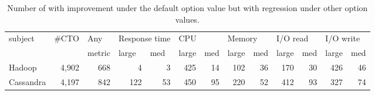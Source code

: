 \begin{table}[t]
\centering
\caption{Number of \instance with improvement under the default option value but with regression under other option values.}
    \begin{tabular}{|l|l|l|l|r|l|r|l|r|l|r|l|r|}
    \hline
    \multirow{2}{*}{subject} & \multirow{2}{*}{\#CTO}     & Any                      & \multicolumn{2}{l|}{Response time}                  & \multicolumn{2}{l|}{CPU}                            & \multicolumn{2}{l|}{Memory}                         & \multicolumn{2}{l|}{I/O read}                       & \multicolumn{2}{l|}{I/O write}                      \\ \cline{4-13} 
                             &                            & metric                   & large                    & \multicolumn{1}{l|}{med} & large                    & \multicolumn{1}{l|}{med} & large                    & \multicolumn{1}{l|}{med} & large                    & \multicolumn{1}{l|}{med} & large                    & \multicolumn{1}{l|}{med} \\ \hline
    Hadoop                   & \multicolumn{1}{r|}{4,902} & \multicolumn{1}{r|}{668} & \multicolumn{1}{r|}{4}   & 3                        & \multicolumn{1}{r|}{425} & 14                       & \multicolumn{1}{r|}{102} & 36                       & \multicolumn{1}{r|}{170} & 30                       & \multicolumn{1}{r|}{426} & 46                       \\ \hline
    Cassandra                & \multicolumn{1}{r|}{4,197} & \multicolumn{1}{r|}{842} & \multicolumn{1}{r|}{122} & 53                       & \multicolumn{1}{r|}{450} & 95                       & \multicolumn{1}{r|}{220} & 52                       & \multicolumn{1}{r|}{412} & 93                       & \multicolumn{1}{r|}{327} & 74                       \\ \hline
    \end{tabular}
\label{tab:option_improvement_default}
\end{table}

